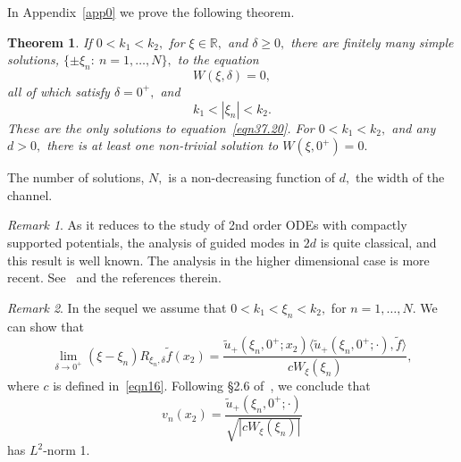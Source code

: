 \documentclass[11pt]{article}
\newcommand\tu{\widetilde u}
\newcommand\tf{\tilde{f}}
\newcommand\bbR{\mathbb R}
\newtheorem{theorem}{Theorem}
\theoremstyle{definition}
\theoremstyle{remark}
\newtheorem{remark}{Remark}
\begin{document}
In
Appendix~\ref{app0} we prove the following theorem.
\begin{theorem}\label{thm0}
  If $0<k_1<k_2,$ for $\xi\in\bbR,$ and $\delta\ge 0,$
  there are finitely many simple solutions, $\{\pm \xi_n:\:n=1,\dots, N\},$ to the equation
  \begin{equation}\label{eqn37.20}
    W(\xi,\delta)=0,
  \end{equation}
  all of which satisfy $\delta=0^+,$ and
  \begin{equation}
   k_1<|\xi_n|<k_2.
  \end{equation}
  These are the only solutions to equation~\eqref{eqn37.20}. For 
  $0<k_1<k_2,$ and any $d>0,$ there is at least one non-trivial solution to $W(\xi,0^+)=0.$
\end{theorem}
\noindent
The number of solutions, $N,$ is a non-decreasing function of $d,$ the
width of the channel.
\begin{remark}
  As it reduces to the study of 2nd order ODEs with compactly
  supported potentials, the analysis of guided modes in $2d$ is quite
  classical, and this result is well known. The analysis in the higher
  dimensional case is more recent. See~\cite{JolyPoirier} and the
  references therein.
\end{remark}

\begin{remark}\label{rmk5.9}
  In the sequel we assume that $0<k_1<\xi_n<k_2,$ for $n=1,\dots,N.$  We can show that
  \begin{equation}
    \lim_{\delta\to 0^+}(\xi-\xi_n)R_{\xi_n,\delta}\tf(x_2)=
    \frac{\tu_{+}(\xi_n,0^+;x_2)\langle \tu_{+}(\xi_n,0^+;\cdot),\tf\rangle}{c W_{\xi}(\xi_n)},
  \end{equation}
  where $c$ is defined in~\eqref{eqn16}. Following \S 2.6
  of~\cite{Titchmarsh1946_ODEs}, we conclude that
  \begin{equation}
    v_n(x_2)=\frac{ \tu_{+}(\xi_n,0^+;\cdot)}{\sqrt{|c W_{\xi}(\xi_n)|}}
  \end{equation}
  has $L^2$-norm 1.
\end{remark}
\end{document}

